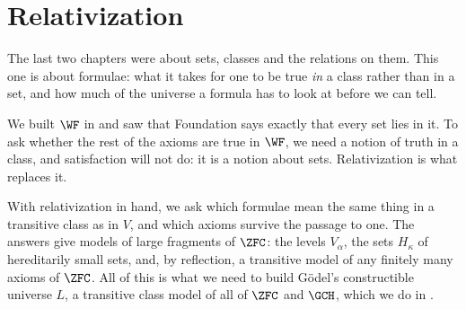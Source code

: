 \chapter{Relativization} \label{Ch3:CH}
\thispagestyle{empty}

The last two chapters were about sets, classes and the relations on them. This one is about formulae: what it takes for one to be true \textit{in} a class rather than in a set, and how much of the universe a formula has to look at before we can tell.

We built $\WF$ in  and saw that Foundation says exactly that every set lies in it. To ask whether the rest of the axioms are true in $\WF$, we need a notion of truth in a class, and satisfaction will not do: it is a notion about sets. Relativization is what replaces it.

With relativization in hand, we ask which formulae mean the same thing in a transitive class as in $V$, and which axioms survive the passage to one. The answers give models of large fragments of $\ZFC$: the levels $V_{\alpha}$, the sets $H_{\kappa}$ of hereditarily small sets, and, by reflection, a transitive model of any finitely many axioms of $\ZFC$. All of this is what we need to build Gödel's constructible universe $L$, a transitive class model of all of $\ZFC$ and $\GCH$, which we do in .









